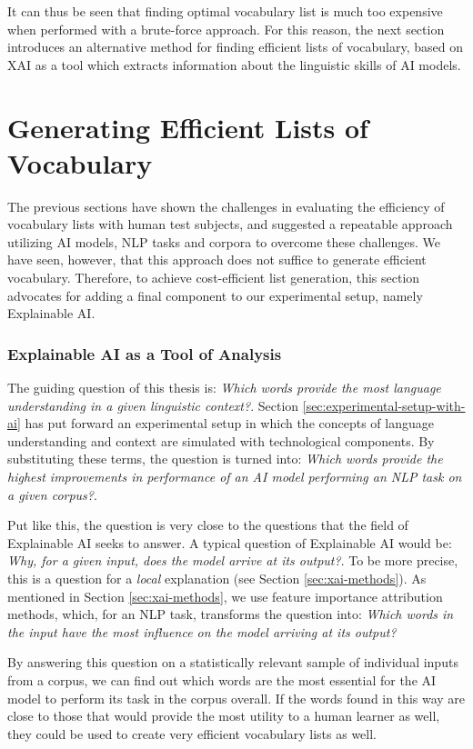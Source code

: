 It can thus be seen that finding optimal vocabulary list is much too expensive when performed with a brute-force approach.
For this reason, the next section introduces an alternative method for finding efficient lists of vocabulary, based on XAI as a tool which extracts information about the linguistic skills of AI models.

\section{Generating Efficient Lists of Vocabulary} \label{sec:list-generation}

The previous sections have shown the challenges in evaluating the efficiency of vocabulary lists with human test subjects, and suggested a repeatable approach utilizing AI models, NLP tasks and corpora to overcome these challenges.
We have seen, however, that this approach does not suffice to generate efficient vocabulary.
Therefore, to achieve cost-efficient list generation, this section advocates for adding a final component to our experimental setup, namely Explainable AI.

\subsubsection{Explainable AI as a Tool of Analysis} \label{sec:xai-as-tools-of-analysis}
The guiding question of this thesis is:
\textit{Which words provide the most language understanding in a given linguistic context?}.
Section \ref{sec:experimental-setup-with-ai} has put forward an experimental setup in which the concepts of language understanding and context are simulated with technological components.
By substituting these terms, the question is turned into:
\textit{Which words provide the highest improvements in performance of an AI model performing an NLP task on a given corpus?}.

Put like this, the question is very close to the questions that the field of Explainable AI seeks to answer.
A typical question of Explainable AI would be:
\textit{Why, for a given input, does the model arrive at its output?}. 
To be more precise, this is a question for a \textit{local} explanation (see Section \ref{sec:xai-methods}).
As mentioned in Section \ref{sec:xai-methods}, we use feature importance attribution methods, which, for an NLP task, transforms the question into:
\textit{Which words in the input have the most influence on the model arriving at its output?}

By answering this question on a statistically relevant sample of individual inputs from a corpus, we can find out which words are the most essential for the AI model to perform its task in the corpus overall.
If the words found in this way are close to those that would provide the most utility to a human learner as well, they could be used to create very efficient vocabulary lists as well.

